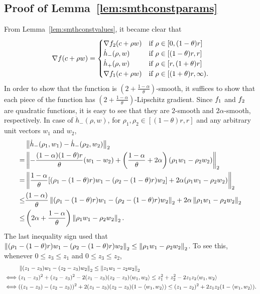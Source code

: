 \subsection{Proof of Lemma~\ref{lem:smthconstparams}}
\label{sec:proof-smthconstparams}
From Lemma~\ref{lem:smthconstvalues}, it became clear that 
\begin{equation*}
	\nabla f(c+\rho w) =
	\begin{cases}
		\nabla f_{2}(c+\rho w) 	& \text{if } \rho \in [0,(1-\theta)r]\\
		\dot h_-(\rho, w) 		& \text{if } \rho \in [(1-\theta)r,r]\\
		\dot h_+(\rho, w) 		& \text{if } \rho \in [r, (1+\theta) r]\\
		\nabla f_{1}(c+\rho w) 	& \text{if } \rho \in [(1+\theta) r, \infty).
	\end{cases}
\end{equation*}
In order to show that the function is $\left (2+\frac{1-\alpha}{\theta}\right )$-smooth, it suffices to show that each piece of the function has $\left (2+\frac{1-\alpha}{\theta}\right )$-Lipschitz gradient. Since $f_{1}$ and $f_{2}$ are quadratic functions, it is easy to see that they are $2$-smooth and $2\alpha$-smooth, respectively. 
In case of $\dot h_-(\rho, w)$, for $\rho_1, \rho_2 \in [(1-\theta)r,r]$ and
any arbitrary unit vectors $w_1$ and $w_2$,
\begin{align*}
	&\left\|{\dot h_-(\rho_1, w_1) - \dot h_-(\rho_2, w_2)}\right\|_2 \\
	=& 	\left\|{
		- \frac{(1-\alpha)(1-\theta)r}{\theta} (w_1-w_2)
		+ \left ( \frac{1-\alpha}{\theta}+2\alpha \right ) (\rho_1 w_1 - \rho_2 w_2)
	}\right\|_2\\
	=& 	\left\|{
		\frac{1-\alpha}{\theta} [(\rho_1-(1-\theta)r) w_1-(\rho_2-(1-\theta)r)w_2]
		+ 2\alpha (\rho_1 w_1 - \rho_2 w_2)
	}\right\|_2\\
	\leq& \frac{(1-\alpha)}{\theta} \left\|{(\rho_1-(1-\theta)r) w_1-(\rho_2-(1-\theta)r)w_2}\right\|_2 + 2\alpha  \left\|{\rho_1 w_1 - \rho_2 w_2}\right\|_2\\
	\leq& \left ( 2\alpha + \frac{1-\alpha}{\theta} \right ) \left\|{\rho_1 w_1 - \rho_2 w_2}\right\|_2.
\end{align*}
The last inequality sign used that $\left\|{(\rho_1-(1-\theta)r) w_1-(\rho_2-(1-\theta)r)w_2}\right\|_2 \leq \left\|{\rho_1 w_1 - \rho_2 w_2}\right\|_2$.
To see this, whenever $0\leq z_3 \leq z_1$ and $0 \leq z_3\leq z_2$,
\begin{align*}
	&\left\|{(z_1-z_3) w_1-(z_2-z_3)w_2}\right\|_2 \leq \left\|{z_1 w_1 - z_2 w_2}\right\|_2\\
	\iff & (z_1-z_3)^2 + (z_2-z_3)^2 - 2(z_1-z_3)(z_2-z_3)\langle w_1,w_2\rangle \leq z_1^2 + z_2^2 - 2 z_1 z_2 \langle w_1,w_2\rangle\\
	\iff & ((z_1-z_3)-(z_2-z_3))^2 + 2(z_1-z_3)(z_2-z_3)(1-\langle w_1,w_2\rangle) \leq (z_1-z_2)^2 + 2 z_1 z_2 (1-\langle w_1,w_2\rangle).
\end{align*}

